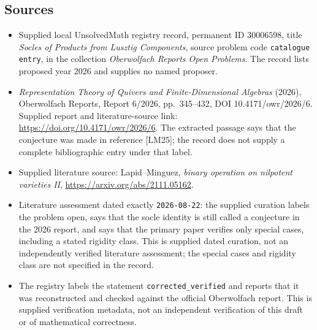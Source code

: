 \documentclass[11pt]{article}
\begin{document}
\subsection{Sources}
\begin{itemize}
\item Supplied local UnsolvedMath registry record, permanent ID \(30006598\), title \emph{Socles of Products from Lusztig Components}, source problem code \texttt{catalogue entry}, in the collection \emph{Oberwolfach Reports Open Problems}. The record lists proposed year 2026 and supplies no named proposer.
\item \emph{Representation Theory of Quivers and Finite-Dimensional Algebras} (2026), Oberwolfach Reports, Report 6/2026, pp.~345--432, DOI 10.4171/owr/2026/6. Supplied report and literature-source link: \url{https://doi.org/10.4171/owr/2026/6}. The extracted passage says that the conjecture was made in reference [LM25]; the record does not supply a complete bibliographic entry under that label.
\item Supplied literature source: Lapid--Minguez, \emph{binary operation on nilpotent varieties II}, \url{https://arxiv.org/abs/2111.05162}.
\item Literature assessment dated exactly \texttt{2026-08-22}: the supplied curation labels the problem open, says that the socle identity is still called a conjecture in the 2026 report, and says that the primary paper verifies only special cases, including a stated rigidity class. This is supplied dated curation, not an independently verified literature assessment; the special cases and rigidity class are not specified in the record.
\item The registry labels the statement \texttt{corrected\_verified} and reports that it was reconstructed and checked against the official Oberwolfach report. This is supplied verification metadata, not an independent verification of this draft or of mathematical correctness.
\end{itemize}
\end{document}
